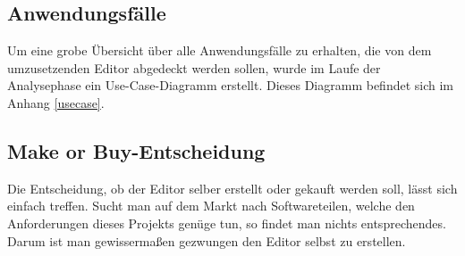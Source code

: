 \subsection{Anwendungsfälle}

Um eine grobe Übersicht über alle Anwendungsfälle zu erhalten, die von dem umzusetzenden Editor
abgedeckt werden sollen, wurde im Laufe der Analysephase ein Use-Case-Diagramm erstellt. Dieses
Diagramm befindet sich im Anhang \ref{usecase}.

\subsection{\glqq Make or Buy\grqq -Entscheidung}
Die Entscheidung, ob der Editor selber erstellt oder gekauft werden soll, lässt sich einfach treffen. Sucht man auf dem Markt nach Softwareteilen, welche den Anforderungen dieses Projekts genüge tun, so findet man nichts entsprechendes. Darum ist man gewissermaßen gezwungen den Editor selbst zu erstellen.

\newpage
